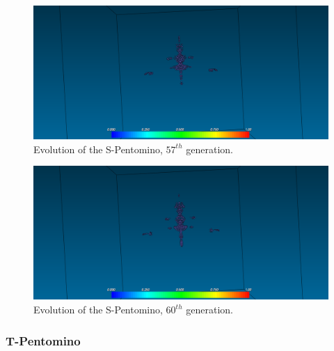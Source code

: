 \begin{figure}[H]
	\centering
	\includegraphics[scale=0.3]{pentominoes_ss/s_57.png}
	\caption{Evolution of the S-Pentomino, $57^{th}$ generation.}
  \label{fig:ss-pent:s-57}
\end{figure}

\begin{figure}[H]
	\centering
	\includegraphics[scale=0.3]{pentominoes_ss/s_60.png}
	\caption{Evolution of the S-Pentomino, $60^{th}$ generation.}
  \label{fig:ss-pent:s-59}
\end{figure}

\subsubsection{T-Pentomino}
\label{sec:t-pentomino}

